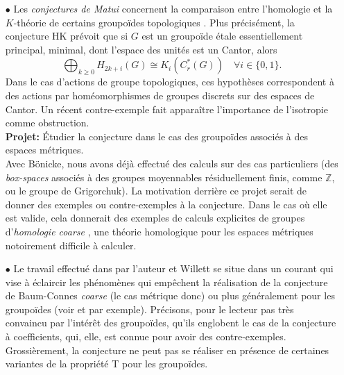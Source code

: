 \documentclass[a4paper,11pt]{article}
\begin{document}
\begin{itemize}
La strat\'egie est ici claire pour la preuve: la classe de complexit\'e nulle satisfaisant l'\'enonc\'e du th\'eor\`eme, il suffit de d\'emontrer que la conjecture est stable pour des d\'ecompositions de groupo\"ides. Essentiellement, cela a d\'ej\`a \'et\'e fait par l'auteur et B\"onicke pour la formule de K\"unneth dans \cite{BonickeDellAiera}. Appliquer la m\^eme id\'ee \`a Baum-Connes est naturel, m\^eme si des difficult\'es techniques devront \^etre surmont\'ees.\\

\item[$\bullet$] Les \textit{conjectures de Matui} concernent la comparaison entre l'homologie et la $K$-th\'eorie de certains groupo\"ides topologiques \cite{matui2016topological}. Plus pr\'ecis\'ement, la conjecture HK pr\'evoit que si $G$ est un groupo\"ide \'etale essentiellement principal, minimal, dont l'espace des unit\'es est un Cantor, alors
\[\bigoplus_{k\geq 0} H_{2k+i}(G) \cong K_i(C^*_r(G))\quad \forall i\in \{0,1\}.\]
Dans le cas d'actions de groupe topologiques, ces hypoth\`eses correspondent \`a des actions par hom\'eomorphismes de groupes discrets sur des espaces de Cantor. Un r\'ecent contre-exemple \cite{Scarparo2020} fait appara\^itre l'importance de l'isotropie comme obstruction. \\

\textbf{Projet:} \'Etudier la conjecture dans le cas des groupo\"ides associ\'es \`a des espaces m\'etriques. \\

Avec B\"onicke, nous avons d\'ej\`a effectu\'e des calculs sur des cas particuliers (des \textit{box-spaces} associ\'es \`a des groupes moyennables r\'esiduellement finis, comme $\mathbb Z$, ou le groupe de Grigorchuk). La motivation derri\`ere ce projet serait de donner des exemples ou contre-exemples \`a la conjecture. Dans le cas o\`u elle est valide, cela donnerait des exemples de calculs explicites de groupes d'\textit{homologie coarse} \cite{NowakYu}, une th\'eorie homologique pour les espaces m\'etriques notoirement difficile \`a calculer.\\


\item[$\bullet$] Le travail effectu\'e dans \cite{DellWillett} par l'auteur et Willett se situe dans un courant qui vise \`a \'eclaircir les ph\'enom\`enes qui emp\^echent la r\'ealisation de la conjecture de Baum-Connes \textit{coarse} (le cas m\'etrique donc) ou plus g\'en\'eralement pour les groupo\"ides (voir \cite{HigsonLaffSk} et \cite{WillettYu} par exemple). Pr\'ecisons, pour le lecteur pas tr\`es convaincu par l'int\'er\^et des groupo\"ides, qu'ils englobent le cas de la conjecture \`a coefficients, qui, elle, est connue pour avoir des contre-exemples. Grossi\`erement, la conjecture ne peut pas se r\'ealiser en pr\'esence de certaines variantes de la propri\'et\'e T pour les groupo\"ides. \\ 


\end{itemize}
\end{document}
